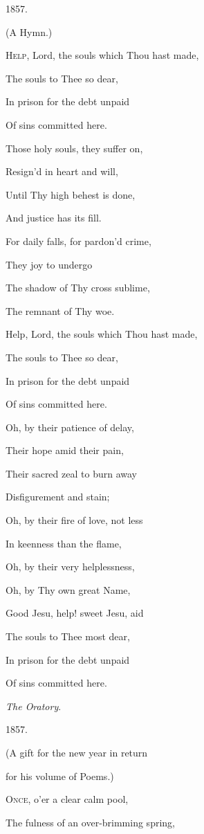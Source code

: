 1857.


(A Hymn.)

H\textsc{elp}, Lord, the souls which Thou hast made,

The souls to Thee so dear,

In prison for the debt unpaid

Of sins committed here.

Those holy souls, they suffer on,

Resign'd in heart and
will,

Until Thy high behest is done,

And justice has its fill.

For daily falls, for pardon'd crime,

They joy to undergo

The shadow of Thy cross sublime,

The remnant of Thy woe.

Help, Lord, the souls which Thou hast made,

The souls to Thee so
dear,

In prison for the debt unpaid

Of sins committed here.

Oh, by their patience of delay,

Their hope amid their
pain,

Their sacred zeal to burn away

Disfigurement and stain;

Oh, by their fire of love, not less

In keenness than the
flame,

Oh, by their very helplessness,

Oh, by Thy own great
Name,

Good Jesu, help! sweet Jesu, aid

The souls to Thee most
dear,

In prison for the debt unpaid

Of sins committed here.

\emph{The Oratory}.

1857.


(A gift for the new year in return

for
his volume
of Poems.)

O\textsc{nce}, o'er a clear calm pool,

The fulness of an over-brimming spring,

